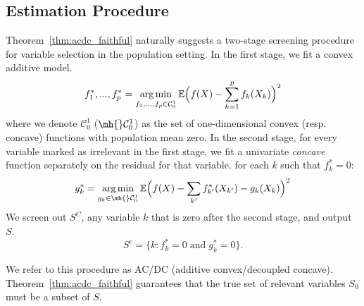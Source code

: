 \def\C{\mathcal{C}}

\subsection{Estimation Procedure}
\label{sec:acdc}

Theorem~\ref{thm:acdc_faithful} naturally suggests 
a two-stage screening procedure for variable selection in the population setting. In the first stage, we fit a convex additive model. 
\begin{equation}
\label{eqn:scam2_pop}
f^*_1, ..., f^*_p = \argmin_{f_1,...,f_p \in \C^1_0} 
   \E \Big( f(X)  - \sum_{k=1}^p f_k(X_k) \Big)^2 
\end{equation}
where we denote $\C^1_0$ ($\mh{}\C^1_0$) as the set of one-dimensional convex (resp. concave) functions with population mean zero. In the second stage, for every variable marked as irrelevant in the first stage, we fit a univariate \emph{concave} function separately on the residual for that variable.
 for each $k$ such that $ f^*_k = 0$:
\begin{equation}
\label{eqn:dc2}
g^*_k = \argmin_{g_k \in \mh{}\C^1_0} 
   \E \Big( f(X) - \sum_{k'} f^*_{k'}(X_{k'}) 
    - g_k(X_{k})\Big)^2 
\end{equation}
We screen out $S^C$, any variable $k$ that is zero after the second stage, and output $S$.
\begin{equation}
\label{eqn:acdc_vars_pop}
S^c = \bigl\{k : f^*_k =
0 \; \mathrm{and}\; g^*_k =0\bigr\}.
\end{equation}

We refer to this procedure as AC/DC (additive
convex/decoupled concave). Theorem~\ref{thm:acdc_faithful} guarantees that the true set of relevant variables $S_0$ must be a subset of $S$.


